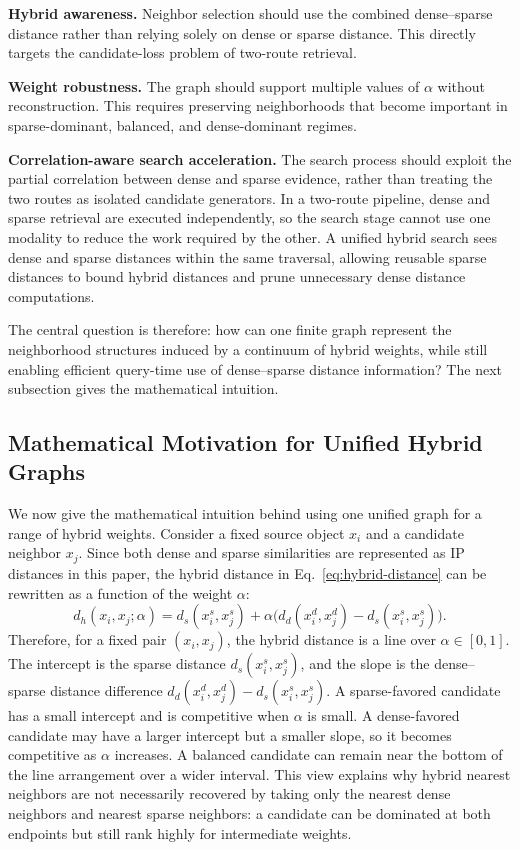 \textbf{Hybrid awareness.} Neighbor selection should use the combined dense--sparse distance rather than relying solely on dense or sparse distance. This directly targets the candidate-loss problem of two-route retrieval.

\textbf{Weight robustness.} The graph should support multiple values of $\alpha$ without reconstruction. This requires preserving neighborhoods that become important in sparse-dominant, balanced, and dense-dominant regimes.

\textbf{Correlation-aware search acceleration.} The search process should exploit the partial correlation between dense and sparse evidence, rather than treating the two routes as isolated candidate generators. In a two-route pipeline, dense and sparse retrieval are executed independently, so the search stage cannot use one modality to reduce the work required by the other. A unified hybrid search sees dense and sparse distances within the same traversal, allowing reusable sparse distances to bound hybrid distances and prune unnecessary dense distance computations.

The central question is therefore: how can one finite graph represent the neighborhood structures induced by a continuum of hybrid weights, while still enabling efficient query-time use of dense--sparse distance information? The next subsection gives the mathematical intuition.

\subsection{Mathematical Motivation for Unified Hybrid Graphs}

We now give the mathematical intuition behind using one unified graph for a range of hybrid weights. Consider a fixed source object $x_i$ and a candidate neighbor $x_j$. Since both dense and sparse similarities are represented as IP distances in this paper, the hybrid distance in Eq.~\eqref{eq:hybrid-distance} can be rewritten as a function of the weight $\alpha$:
\begin{equation}
    d_h(x_i,x_j;\alpha)
    = d_s(x_i^s,x_j^s)
    + \alpha\big(d_d(x_i^d,x_j^d)-d_s(x_i^s,x_j^s)\big).
    \label{eq:alpha-line}
\end{equation}
Therefore, for a fixed pair $(x_i,x_j)$, the hybrid distance is a line over $\alpha\in[0,1]$. The intercept is the sparse distance $d_s(x_i^s,x_j^s)$, and the slope is the dense--sparse distance difference $d_d(x_i^d,x_j^d)-d_s(x_i^s,x_j^s)$. A sparse-favored candidate has a small intercept and is competitive when $\alpha$ is small. A dense-favored candidate may have a larger intercept but a smaller slope, so it becomes competitive as $\alpha$ increases. A balanced candidate can remain near the bottom of the line arrangement over a wider interval. This view explains why hybrid nearest neighbors are not necessarily recovered by taking only the nearest dense neighbors and nearest sparse neighbors: a candidate can be dominated at both endpoints but still rank highly for intermediate weights.


